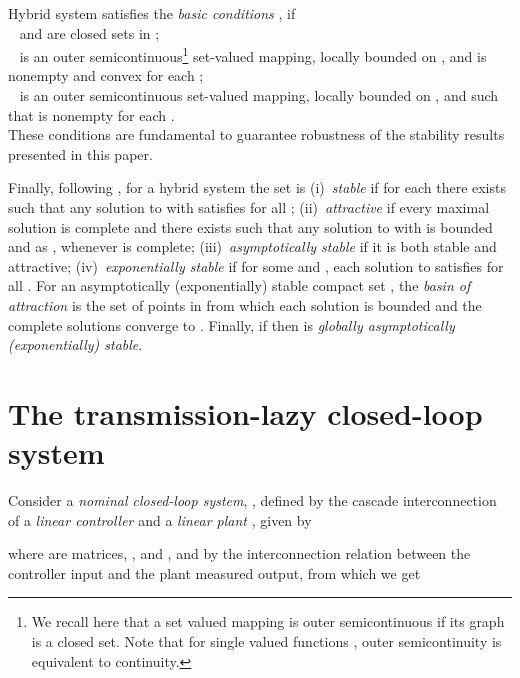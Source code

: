 \documentclass[twocolumn]{autart}
\begin{document}
{

Hybrid system  satisfies the 
\emph{basic conditions} \cite{GoebelCSM09},\cite{Goebel12} if \\
\textbullet~ and  are closed sets in ; \\
\textbullet~ is an 
outer semicontinuous\footnote{We recall here that a 
set valued mapping is outer semicontinuous if its graph is a closed set.
Note that for single valued functions , outer semicontinuity is
equivalent to continuity.} set-valued mapping, locally bounded on , and 
 is nonempty and convex for each ; \\
\textbullet~ is an outer semicontinuous set-valued mapping, 
locally bounded on , and such that  is nonempty for each .\\
These conditions are fundamental to guarantee robustness of the stability
results presented in this paper.
} 


Finally, following \cite{GoebelCSM09}, for a hybrid system 
the set  is 
(i)~\emph{stable} if for each  
there exists  such that any solution  to  
with  satisfies  
for all ; 
(ii)~\emph{attractive} if { every maximal solution is complete} and 
there exists 
such that any solution  to  with 
is bounded and  as , 
whenever  is complete; 
(iii)~\emph{asymptotically stable} if it is both stable and attractive;
(iv)~\emph{exponentially stable} if for some  and , 
each solution  to  satisfies 
 for all . 
For an asymptotically (exponentially) stable compact set , 
the \emph{basin of attraction}  is the set of points
in  from which each solution is bounded and the complete
solutions converge to . Finally, 
if  then  
is \emph{globally asymptotically (exponentially) stable}. 



\section{The transmission-lazy closed-loop system} 
\label{sec:model}
Consider a \emph{nominal closed-loop system}, , defined by  
the cascade interconnection  
of a \emph{linear controller}  and a \emph{linear plant} 
, given by

where  are matrices, , and , 
and by the interconnection relation  
between the controller input and the plant measured output, 
from which we get
\end{document}
